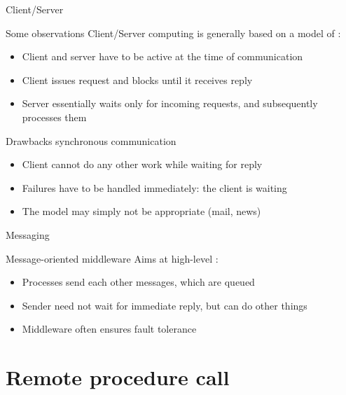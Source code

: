 \begin{slide}{Client/Server}
  \begin{block}{Some observations}
    Client/Server computing is generally based on a model of :
    \begin{itemize}\tightlist
    \item Client and server have to be active at the time of communication
    \item Client issues request and blocks until it receives reply
    \item Server essentially waits only for incoming requests, and subsequently processes them
    \end{itemize}
  \end{block}
  \begin{block}{Drawbacks synchronous communication}
    \begin{itemize}\tightlist
    \item Client cannot do any other work while waiting for reply
    \item Failures have to be handled immediately: the client is waiting
    \item The model may simply not be appropriate (mail, news)
    \end{itemize}
  \end{block}
\end{slide}
\begin{slide}{Messaging}
  \begin{block}{Message-oriented middleware}
    Aims at high-level :
    \begin{itemize}\tightlist
    \item Processes send each other messages, which are queued
    \item Sender need not wait for immediate reply, but can do other things
    \item Middleware often ensures  fault tolerance
    \end{itemize}
  \end{block}
\end{slide}
\section{Remote procedure call}
